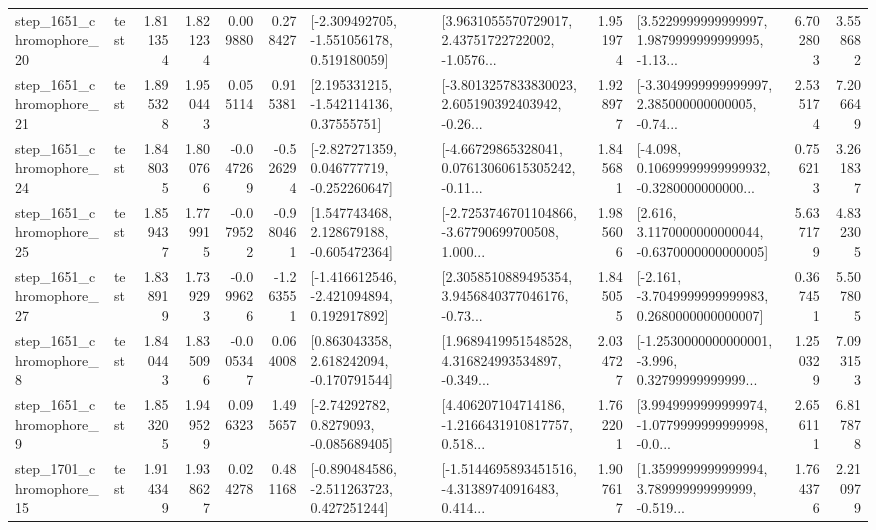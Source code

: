 \begin{tabular}{llrrrrllrlrr}
 step\_1651\_chromophore\_20 &      test &      1.811354 &    1.821234 &      0.009880 &  0.278427 &   [-2.309492705, -1.551056178, 0.519180059] &  [3.9631055570729017, 2.43751722722002, -1.0576... &       1.951974 &  [3.5229999999999997, 1.9879999999999995, -1.13... &            6.702803 &          3.558682 \\
 step\_1651\_chromophore\_21 &      test &      1.895328 &    1.950443 &      0.055114 &  0.915381 &     [2.195331215, -1.542114136, 0.37555751] &  [-3.8013257833830023, 2.605190392403942, -0.26... &       1.928977 &  [-3.3049999999999997, 2.385000000000005, -0.74... &            2.535174 &          7.206649 \\
 step\_1651\_chromophore\_24 &      test &      1.848035 &    1.800766 &     -0.047269 & -0.526294 &   [-2.827271359, 0.046777719, -0.252260647] &  [-4.66729865328041, 0.07613060615305242, -0.11... &       1.845681 &  [-4.098, 0.10699999999999932, -0.3280000000000... &            0.756213 &          3.261837 \\
 step\_1651\_chromophore\_25 &      test &      1.859437 &    1.779915 &     -0.079522 & -0.980461 &    [1.547743468, 2.128679188, -0.605472364] &  [-2.7253746701104866, -3.67790699700508, 1.000... &       1.985606 &   [2.616, 3.1170000000000044, -0.6370000000000005] &            5.637179 &          4.832305 \\
 step\_1651\_chromophore\_27 &      test &      1.838919 &    1.739293 &     -0.099626 & -1.263551 &   [-1.416612546, -2.421094894, 0.192917892] &  [2.3058510889495354, 3.9456840377046176, -0.73... &       1.845055 &  [-2.161, -3.7049999999999983, 0.2680000000000007] &            0.367451 &          5.507805 \\
  step\_1651\_chromophore\_8 &      test &      1.840443 &    1.835096 &     -0.005347 &  0.064008 &    [0.863043358, 2.618242094, -0.170791544] &  [1.9689419951548528, 4.316824993534897, -0.349... &       2.034727 &  [-1.2530000000000001, -3.996, 0.32799999999999... &            1.250329 &          7.093153 \\
  step\_1651\_chromophore\_9 &      test &      1.853205 &    1.949529 &      0.096323 &  1.495657 &      [-2.74292782, 0.8279093, -0.085689405] &  [4.406207104714186, -1.2166431910817757, 0.518... &       1.762201 &  [3.9949999999999974, -1.0779999999999998, -0.0... &            2.656111 &          6.817878 \\
 step\_1701\_chromophore\_15 &      test &      1.914349 &    1.938627 &      0.024278 &  0.481168 &   [-0.890484586, -2.511263723, 0.427251244] &  [-1.5144695893451516, -4.31389740916483, 0.414... &       1.907617 &  [1.3599999999999994, 3.789999999999999, -0.519... &            1.764376 &          2.210979 \\

\end{tabular}
